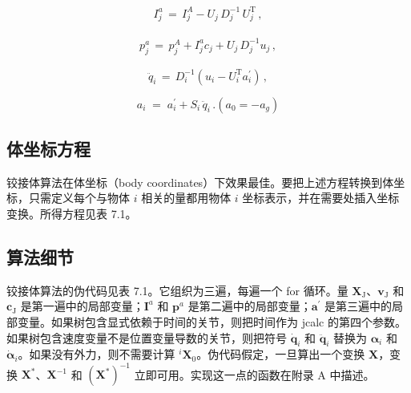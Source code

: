 \documentclass[10pt,a4paper]{book}
\theoremstyle{thmstyle} %
\theoremstyle{defstyle} %
\theoremstyle{prostyle} %
\begin{document}
$$
\begin{array}{r} { I _ { j } ^{a} \, = \, I _ { j } ^{A} - U _ { j } \, D _ { j } ^{- 1} \, U _ { j } ^{\mathrm { T} } \, , } \end{array}
$$



$$
\begin{array}{r} { p _ { j } ^{a} \, = \, p _ { j } ^{A} + I _ { j } ^{a} c _ { j } + U _ { j } \, D _ { j } ^{- 1} u _ { j } \, , } \end{array}
$$



$$
\ddot { q } _ { i } \, = \, D _ { i } ^{- 1} ( u _ { i } - U _ { i } ^{\mathrm { T} } a _ { i } ^{\prime} ) \, ,
$$



$$
a _ { i } \; = \; a _ { i } ^{\prime} + S _ { i } \, \ddot { q } _ { i } \, .  ( a _ { 0 } = - a _ { g } )
$$



\subsection{体坐标方程}





铰接体算法在体坐标（body coordinates）下效果最佳。要把上述方程转换到体坐标，只需定义每个与物体 $i$ 相关的量都用物体 $i$ 坐标表示，并在需要处插入坐标变换。所得方程见表 7.1。



\subsection{算法细节}





铰接体算法的伪代码见表 7.1。它组织为三遍，每遍一个 for 循环。量 $\mathbf{X}_{\mathrm{J}}$、$\boldsymbol{v}_{\mathrm{J}}$ 和 $\boldsymbol{c}_{\mathrm{J}}$ 是第一遍中的局部变量；$\boldsymbol{I}^{a}$ 和 $\boldsymbol{p}^{a}$ 是第二遍中的局部变量；$\boldsymbol{a}^{\prime}$ 是第三遍中的局部变量。如果树包含显式依赖于时间的关节，则把时间作为 jcalc 的第四个参数。如果树包含速度变量不是位置变量导数的关节，则把符号 $\dot{\boldsymbol{q}}_{i}$ 和 $\ddot{\boldsymbol{q}}_{i}$ 替换为 $\boldsymbol{\alpha}_{i}$ 和 $\dot{\boldsymbol{\alpha}}_{i}$。如果没有外力，则不需要计算 ${}^{i}\mathbf{X}_{0}$。伪代码假定，一旦算出一个变换 $\mathbf{X}$，变换 $\boldsymbol{X}^{*}$、$\boldsymbol{X}^{-1}$ 和 $(\boldsymbol{X}^{*})^{-1}$ 立即可用。实现这一点的函数在附录 A 中描述。
\end{document}
